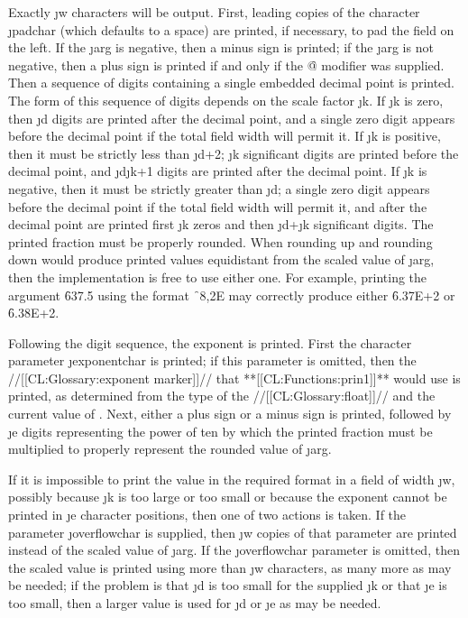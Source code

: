 Exactly \j{w} characters will
be output.  First, leading copies of the character \j{padchar}
(which defaults to a space) are printed, if necessary, to pad the
field on the left.
If the \j{arg} is negative, then a minus sign is printed;
if the \j{arg} is not negative, then a plus sign is printed
if and only if the \f{@}
modifier was supplied.  Then a sequence
of digits containing a single embedded decimal point is printed.
The form of this sequence of digits depends on the scale factor \j{k}.
If \j{k} is zero, then \j{d} digits are printed after the decimal
point, and a single zero digit appears before the decimal point if
the total field width will permit it.  If \j{k} is positive,
then it must be strictly less than \j{d}+2;  \j{k} significant digits
are printed before the decimal point, and \j{d}\minussign \j{k}+1
digits are printed after the decimal point.  If \j{k} is negative,
then it must be strictly greater than \minussign \j{d};
a single zero digit appears before the decimal point if
the total field width will permit it, and after the decimal point
are printed first
\minussign \j{k} zeros and then \j{d}+\j{k} significant digits.
The printed fraction must be properly rounded.         
When rounding up and rounding down would produce printed values
equidistant from the scaled value of \j{arg}, then the implementation
is free to use either one.  For example, printing the argument
\f{637.5} using the format \f{~8,2E} may correctly produce
either \f{6.37E+2} or \f{6.38E+2}.


Following the digit sequence, the exponent is printed.
First the character parameter \j{exponentchar} is printed; if this
parameter is omitted, then the //[[CL:Glossary:exponent marker]]// that
**[[CL:Functions:prin1]]** would use is printed, as determined from the
type of the //[[CL:Glossary:float]]// and the current value of
.
Next, either a plus sign or a minus sign
is printed, followed by \j{e} digits representing the power of
ten by which the printed fraction must be multiplied
to properly represent the rounded value of \j{arg}.


If it is impossible to print the value in the required format in a field
of width \j{w}, possibly because \j{k} is too large or too small
or because the exponent cannot be printed in \j{e} character positions,
then one of two actions is taken.  If the
parameter \j{overflowchar} is supplied, then \j{w} copies of that
parameter are printed instead of the scaled value of \j{arg}.
If the \j{overflowchar} parameter is omitted, then the scaled value
is printed using more than \j{w} characters, as many more as may be
needed; if the problem is that \j{d} is too small for the supplied \j{k}
or that \j{e} is too small, then a larger value is used for \j{d} or \j{e}
as may be needed.


